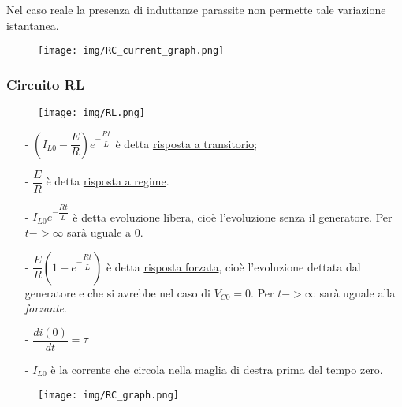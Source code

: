 \documentclass{article}
\begin{document}
\noindent Nel caso reale la presenza di induttanze parassite non permette tale variazione istantanea.
\begin{figure}[h!]
    \begin{center}
        \texttt{[image: img/RC\_current\_graph.png]}
    \end{center}
\end{figure}


\subsubsection{Circuito RL}

\medskip
\noindent{}
\begin{figure}[h!]
    \begin{center}
        \texttt{[image: img/RL.png]}
    \end{center}
\end{figure}

\medskip
\begin{itemize}
    \item[-] $(I_{L0}-\dfrac{E}{R})e^{-\dfrac{Rt}{L}}$ è detta \underline{risposta a transitorio};
    \item[-] $\dfrac{E}{R}$ è detta \underline{risposta a regime}.
    \item[-] $I_{L0}e^{-\dfrac{Rt}{L}}$ è detta \underline{evoluzione libera}, cioè l'evoluzione senza il generatore. Per $t->\infty$ sarà uguale a 0.
    \item[-] $\dfrac{E}{R}(1-e^{-\dfrac{Rt}{L}})$ è detta \underline{risposta forzata}, cioè l'evoluzione dettata dal generatore e che si avrebbe
    nel caso di $V_{C0}=0$. Per $t->\infty$ sarà uguale alla \textit{forzante}.
    \item[-] $\dfrac{d i(0)}{d t}=\tau$
    \item[-] $I_{L0}$ è la corrente che circola nella maglia di destra prima del tempo zero.
\end{itemize}

\pagebreak

\begin{figure}[h!]
    \begin{center}
        \texttt{[image: img/RC\_graph.png]}
    \end{center}
\end{figure}
\end{document}
